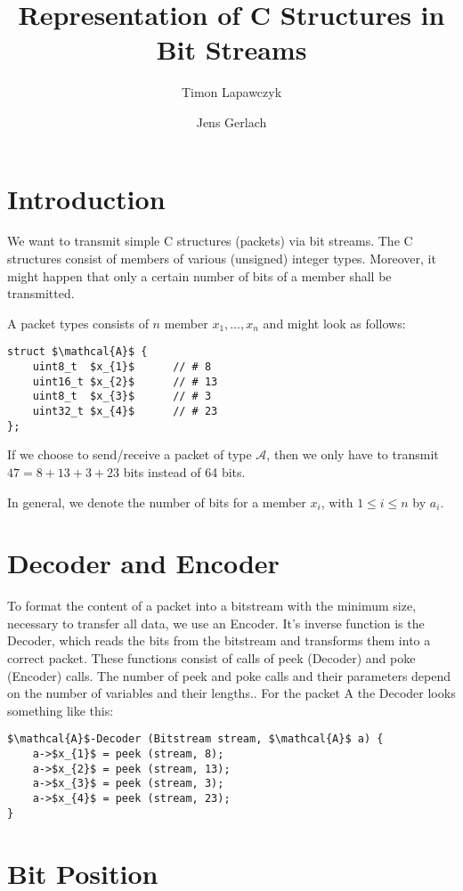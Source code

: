 \documentclass[parskip=half,paper=a4,DIV=12]{scrartcl}
\title{Representation of C Structures in Bit Streams}
\author{Timon Lapawczyk \and Jens Gerlach}
\begin{document}
\maketitle

\section{Introduction}

We want to transmit simple C structures (packets) via bit streams.
The C structures consist of members of various (unsigned) integer types.
Moreover, it might happen that only a certain number of bits of a member
shall be transmitted. 

A packet types consists of $n$ member $x_1,\ldots, x_n$ and might look as follows:

\begin{lstlisting}[mathescape]
struct $\mathcal{A}$ {
	uint8_t  $x_{1}$      // # 8
	uint16_t $x_{2}$      // # 13
	uint8_t  $x_{3}$      // # 3
	uint32_t $x_{4}$      // # 23
};
\end{lstlisting}

If we choose to send\slash receive a packet of type $\mathcal{A}$, then
we only have to transmit $47 = 8 + 13 + 3 + 23$ bits instead of 64 bits.

In general, we denote the number of bits for a member $x_i$, with $1 \leq i \leq n$  by $a_i$.

\section{Decoder and Encoder}

To format the content of a packet into a bitstream with the minimum size, necessary to transfer all data, we use an Encoder.
It's inverse function is the Decoder, which reads the bits
from the bitstream and transforms them into a correct packet.
These functions consist of calls of peek (Decoder) and poke (Encoder) calls.
The number of peek and poke calls and their parameters depend on the number of variables and their lengths..
For the packet A the Decoder looks something like this:

\begin{lstlisting}[mathescape]
$\mathcal{A}$-Decoder (Bitstream stream, $\mathcal{A}$ a) {
	a->$x_{1}$ = peek (stream, 8);
	a->$x_{2}$ = peek (stream, 13);
	a->$x_{3}$ = peek (stream, 3);
	a->$x_{4}$ = peek (stream, 23);
}
\end{lstlisting}

\section{Bit Position}
\end{document}
